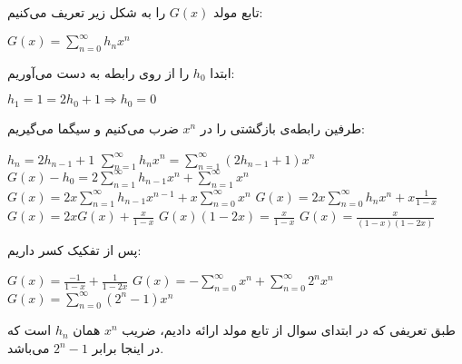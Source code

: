 \p
  تابع مولد $G(x)$ را به شکل زیر تعریف می‌کنیم:\\
        \begin{center}
            $G(x) = \sum_{n = 0}^{\infty} h_nx^n$
        \end{center}
        ابتدا $h_0$ را از روی رابطه به دست می‌آوریم:\\
        \begin{center}
            $h_1 = 1 = 2h_0 + 1 \Rightarrow h_0 = 0$
        \end{center}
        طرفین رابطه‌ی بازگشتی را در $x^n$ ضرب می‌کنیم و سیگما می‌گیریم:\\
        \begin{center}
            $h_n = 2h_{n-1} + 1$ 
            \medbreak
            $\sum_{n = 1}^{\infty} h_nx^n = \sum_{n = 1}^{\infty} (2h_{n-1}+1)x^n$ 
            \medbreak
            $G(x) - h_0 = 2\sum_{n = 1}^{\infty} h_{n-1}x^n + \sum_{n = 1}^{\infty}x^n$
            \medbreak
            $G(x) = 2x\sum_{n = 1}^{\infty} h_{n-1}x^{n-1} + x\sum_{n = 0}^{\infty}x^n$
            \medbreak
            $G(x) = 2x\sum_{n = 0}^{\infty} h_{n}x^{n} + x\frac{1}{1 - x}$
            \medbreak
            $G(x) = 2xG(x) + \frac{x}{1 - x}$
            \medbreak
            $G(x)(1 - 2x) = \frac{x}{1 - x}$
            \medbreak
            $G(x) = \frac{x}{(1 - x)(1 - 2x)}$
        \end{center}
        پس از تفکیک کسر داریم:\\
        \begin{center}
            $G(x) = \frac{-1}{1 - x} + \frac{1}{1 - 2x}$
            \medbreak
            $G(x) = -\sum_{n = 0}^{\infty} x^n + \sum_{n = 0}^{\infty} 2^nx^n$
            \medbreak
            $G(x) = \sum_{n = 0}^{\infty} (2^n - 1)x^n$
        \end{center}
        طبق تعریفی که در ابتدای سوال از تابع مولد ارائه دادیم، ضریب $x^n$ همان $h_n$ است
        که در اینجا برابر
        $2^n - 1$
        می‌باشد.